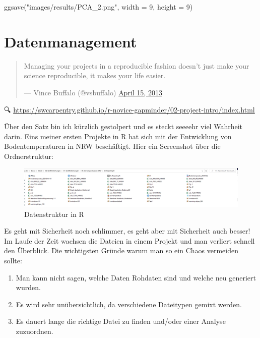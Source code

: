 \documentclass[
]{article}
\newenvironment{Shaded}{\begin{snugshade}}{\end{snugshade}}
\newcommand{\AttributeTok}[1]{\textcolor[rgb]{0.77,0.63,0.00}{#1}}
\newcommand{\DecValTok}[1]{\textcolor[rgb]{0.00,0.00,0.81}{#1}}
\newcommand{\FunctionTok}[1]{\textcolor[rgb]{0.00,0.00,0.00}{#1}}
\newcommand{\NormalTok}[1]{#1}
\newcommand{\StringTok}[1]{\textcolor[rgb]{0.31,0.60,0.02}{#1}}
\providecommand{\tightlist}{%
  \setlength{\itemsep}{0pt}\setlength{\parskip}{0pt}}
\begin{document}
\begin{Shaded}
\begin{Highlighting}[]

\FunctionTok{ggsave}\NormalTok{(}\StringTok{"images/results/PCA\_2.png"}\NormalTok{, }\AttributeTok{width =} \DecValTok{9}\NormalTok{, }\AttributeTok{height =} \DecValTok{9}\NormalTok{)}
\end{Highlighting}
\end{Shaded}

\hypertarget{datenmanagement}{%
\section{Datenmanagement}\label{datenmanagement}}

\begin{quote}
Managing your projects in a reproducible fashion doesn't just make
your science reproducible, it makes your life easier.

--- Vince Buffalo (@vsbuffalo) \href{https://twitter.com/vsbuffalo/status/323638476153167872}{April 15,
2013}
\end{quote}

🔍 \url{https://swcarpentry.github.io/r-novice-gapminder/02-project-intro/index.html}

Über den Satz bin ich kürzlich gestolpert und es steckt seeeehr viel Wahrheit darin. Eins meiner ersten Projekte in R hat sich mit der Entwicklung von Bodentemperaturen in NRW beschäftigt. Hier ein Screenshot über die Ordnerstruktur:

\begin{figure}

{\centering \includegraphics[width=23.15in]{images/049} 

}

\caption{Datenstruktur in R}\label{fig:unnamed-chunk-288}
\end{figure}

Es geht mit Sicherheit noch schlimmer, es geht aber mit Sicherheit auch besser! Im Laufe der Zeit wachsen die Dateien in einem Projekt und man verliert schnell den Überblick. Die wichtigsten Gründe warum man so ein Chaos vermeiden sollte:

\begin{enumerate}
\def\labelenumi{\arabic{enumi}.}
\tightlist
\item
  Man kann nicht sagen, welche Daten Rohdaten sind und welche neu generiert wurden.
\item
  Es wird sehr unübersichtlich, da verschiedene Dateitypen gemixt werden.
\item
  Es dauert lange die richtige Datei zu finden und/oder einer Analyse zuzuordnen.
\end{enumerate}
\end{document}
